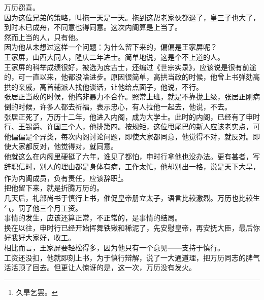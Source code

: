 \begin{multicols}{\theparacolNo}
万历窃喜。\\

因为这位兄弟的策略，叫拖一天是一天。拖到这帮老家伙都退了，皇三子也大了，到时木已成舟，不同意也得同意。这次内阁算是上当了。\\

然而上当的人，只有他。\\

因为他从未想过这样一个问题：为什么留下来的，偏偏是王家屏呢？\\

王家屏，山西大同人，隆庆二年进士。简单地说，这是个不上道的人。\\

王家屏的科举成绩很好，被选为庶吉士，还编过《世宗实录》，应该说是很有前途的，可一直以来，他都没啥进步。原因很简单，高拱当政的时候，他曾上书弹劾高拱的亲戚，高首辅派人找他谈话，让他给点面子，他说，不行。\\

张居正当政的时候，他搞非暴力不合作。照常上班，就是不靠拢上级，张居正刚病倒的时候，许多人都去祈福，表示忠心，有人拉他一起去，他说，不去。\\

张居正死了，万历十二年，他进入内阁，成为大学士。此时的内阁，已经有了申时行、王锡爵、许国三个人，他排第四。按规矩，这位甩尾巴的新人应该老实点，可他偏偏是个异类，每次内阁讨论问题，即使大家都同意，他觉得不对，就反对。即使大家都反对，他觉得对，就同意。\\

他就这么在内阁里硬挺了六年，谁见了都怕，申时行拿他也没办法。更有甚者，写辞职信时，别人的理由都是身体有病，工作太忙，他却别出一格，说是天下大旱，作为内阁成员，负有责任，应该辞职\footnote{久旱乞罢。}。\\

把他留下来，就是折腾万历的。\\

几天后，礼部尚书于慎行上书，催促皇帝册立太子，语言比较激烈。万历也比较生气，罚了他三个月工资。\\

事情的发生，应该还算正常，不正常的，是事情的结局。\\

换在以往，申时行已经开始挥舞铁锹和稀泥了，先安慰皇帝，再安抚大臣，最后你好我好大家好，收工。\\

相比而言，王家屏要轻松得多，因为他只有一个意见——支持于慎行。\\

工资还没扣，他就即刻上书，为于慎行辩解，说了一大通道理，把万历同志的脾气活活顶了回去。但更让人惊讶的是，这一次，万历没有发火。\\


\end{multicols}
